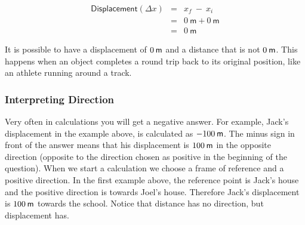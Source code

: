 \begin{minipage}{0.5\textwidth}
\begin{eqnarray*}
\mathsf{Displacement} (\Delta x) &=& x_f~ - ~ x_i\\
&=&0\ \mathsf{m} + 0\ \mathsf{m}\\
&=&0\ \mathsf{m}
\end{eqnarray*}
\end{minipage} 
      \label{m38788*id63886}It is possible to have a displacement of $0\phantom{\rule{2pt}{0ex}}\mathsf{m}$ and a distance that is not $0\phantom{\rule{2pt}{0ex}}\mathsf{m}$. This happens when an object completes a round trip back to its original position, like an athlete running around a track.\par 
      \label{m38788*uid18}
            \subsubsection*{Interpreting Direction}
            \nopagebreak
        \label{m38788*id63901}Very often in calculations you will get a negative answer. For example, Jack's displacement in the example above, is calculated as $-100\phantom{\rule{2pt}{0ex}}\mathsf{m}$. The minus sign in front of the answer means that his displacement is $100\phantom{\rule{2pt}{0ex}}\mathsf{m}$ in the opposite direction (opposite to the direction chosen as positive in the beginning of the question). When we start a calculation we choose a frame of reference and a positive direction. In the first example above, the reference point is Jack's house and the positive direction is towards Joel's house. Therefore Jack's displacement is $100\phantom{\rule{2pt}{0ex}}\mathsf{m}$ towards the school. Notice that distance has no direction, but displacement has.\par 
      \label{m38788*uid19}
